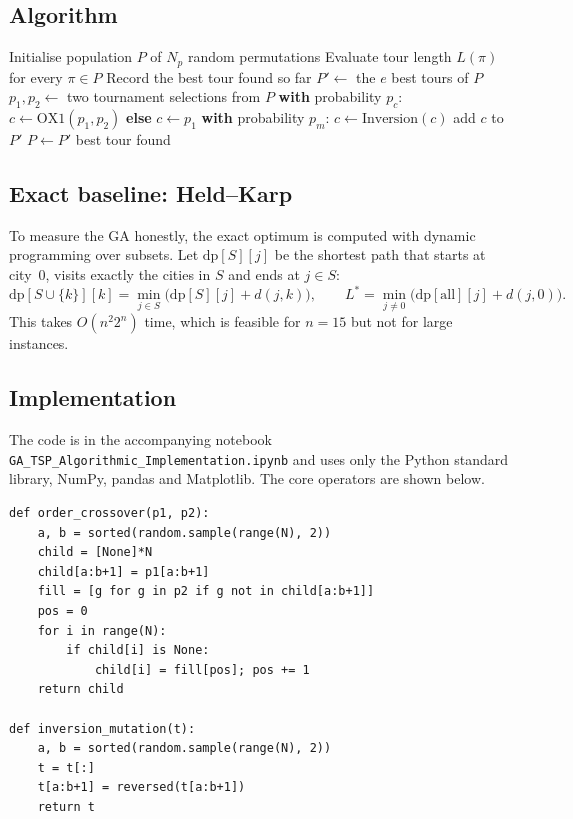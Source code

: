 \documentclass[11pt,a4paper]{article}
\begin{document}
\subsection{Algorithm}
\begin{algorithm}[H]
\caption{Genetic Algorithm for TSP}
\begin{algorithmic}[1]
\State Initialise population $P$ of $N_p$ random permutations
  \State Evaluate tour length $L(\pi)$ for every $\pi\in P$
  \State Record the best tour found so far
  \State $P' \gets$ the $e$ best tours of $P$ 
    \State $p_1,p_2 \gets$ two tournament selections from $P$
    \State \textbf{with} probability $p_c$: $c \gets \text{OX1}(p_1,p_2)$ \textbf{else} $c \gets p_1$
    \State \textbf{with} probability $p_m$: $c \gets \text{Inversion}(c)$
    \State add $c$ to $P'$
  \EndWhile
  \State $P \gets P'$
\EndFor
\State \Return best tour found
\end{algorithmic}
\end{algorithm}

\subsection{Exact baseline: Held--Karp}
To measure the GA honestly, the exact optimum is computed with dynamic programming over subsets. Let
$\text{dp}[S][j]$ be the shortest path that starts at city~0, visits exactly the cities in $S$ and ends at
$j\in S$:
\[
  \text{dp}[S\cup\{k\}][k]=\min_{j\in S}\bigl(\text{dp}[S][j]+d(j,k)\bigr),
  \qquad
  L^\ast=\min_{j\neq0}\bigl(\text{dp}[\text{all}][j]+d(j,0)\bigr).
\]
This takes $O(n^2 2^n)$ time, which is feasible for $n=15$ but not for large instances.

\subsection{Implementation}
The code is in the accompanying notebook \texttt{GA\_TSP\_Algorithmic\_Implementation.ipynb} and uses only
the Python standard library, NumPy, pandas and Matplotlib. The core operators are shown below.

\begin{lstlisting}
def order_crossover(p1, p2):
    a, b = sorted(random.sample(range(N), 2))
    child = [None]*N
    child[a:b+1] = p1[a:b+1]
    fill = [g for g in p2 if g not in child[a:b+1]]
    pos = 0
    for i in range(N):
        if child[i] is None:
            child[i] = fill[pos]; pos += 1
    return child

def inversion_mutation(t):
    a, b = sorted(random.sample(range(N), 2))
    t = t[:]
    t[a:b+1] = reversed(t[a:b+1])
    return t
\end{lstlisting}
\end{document}
